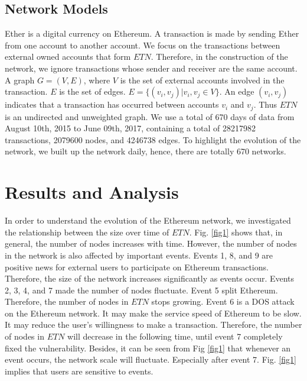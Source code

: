 \documentclass[conference]{IEEEtran}
\begin{document}
\begin{CJK*}{UTF8}{gbsn}
\subsection{Network Models}

Ether is a digital currency on Ethereum. A transaction is made by sending Ether from one account to another account. We focus on the transactions between external owned accounts that form $ETN$. Therefore, in the construction of the network, we ignore transactions whose sender and receiver are the same account.
A graph $G=(V, E)$, where $V$ is the set of external accounts involved in the transaction. $E$ is the set of edges. $ E= \{\left(v_i,v_j\right)|v_i,v_j\in V\} $. An edge $(v_i,v_j)$ indicates that a transaction has occurred between accounts $v_i$ and $v_j$. Thus $ETN$ is an undirected and unweighted graph. We use a total of 670 days of data from August 10th, 2015 to June 09th, 2017, containing a total of 28217982 transactions, 2079600 nodes, and 4246738 edges. To highlight the evolution of the network, we built up the network daily, hence, there are totally 670 networks.

\section{Results and Analysis}

In order to understand the evolution of the Ethereum network, we investigated the relationship between the size over time of $ETN$. Fig. \ref{fig1} shows that, in general, the number of nodes increases with time. However, the number of nodes in the network is also affected by important events. Events 1, 8, and 9 are positive news for external users to participate on Ethereum transactions. Therefore, the size of the network increases significantly as events occur. Events 2, 3, 4, and 7 made the number of nodes fluctuate. Event 5 split Ethereum. Therefore, the number of nodes in $ETN$ stops growing. Event 6 is a DOS attack on the Ethereum network. It may make the service speed of Ethereum to be slow. It may reduce the user's willingness to make a transaction. Therefore, the number of nodes in $ETN$ will decrease in the following time, until event 7 completely fixed the vulnerability. Besides, it can be seen from Fig \ref{fig1} that whenever an event occurs, the network scale will fluctuate. Especially after event 7. Fig. \ref{fig1} implies that users are sensitive to events.


\end{CJK*}
\end{document}
